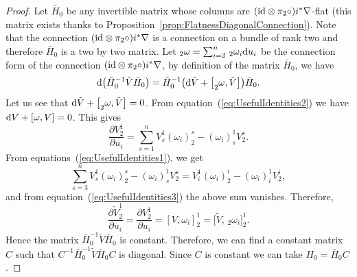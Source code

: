 \documentclass[10pt,a4paper]{amsart}
\numberwithin{equation}{section}
\begin{document}
 \begin{proof}
 Let $\bar{H}_{0}$ be any invertible matrix whose columns are $({\rm id}\otimes\pi_{2}\circ)i^{*}\nabla$-flat (this matrix exists thanks to Proposition~\ref{prop:FlatnessDiagonalConnection}). Note that the connection $({\rm id}\otimes\pi_{2}\circ)i^{*}\nabla$ is a connection on a bundle of rank two and therefore $\bar{H}_{0}$ is a two by two matrix. Let $_{2}\omega=\sum_{i=2}^{n}\,_{2}\omega_{i}{\rm d}u_{i}$ be the connection form of the connection $({\rm id}\otimes\pi_{2}\circ)i^{*}\nabla$, by definition of the matrix $\bar{H}_{0}$, we have
 \begin{equation*}
 {\rm d}\bigl(\bar{H}_{0}^{-1}\tilde{V}\bar{H}_{0}\bigr)=\bar{H}_{0}^{-1}\bigl({\rm d}\tilde{V}+\big[_{2}\omega,\tilde{V}\big]\bigr)\bar{H}_{0}.
 \end{equation*}
 Let us see that ${\rm d}\tilde{V}+\big[_{2}\omega,\tilde{V}\big]=0$. From equation~(\ref{eq:UsefulIdentities2}) we have ${\rm d}V+[\omega,V]=0$. This gives
 \begin{equation*}
 \frac{\partial V^{1}_{2}}{\partial u_{i}}=\sum_{s=1}^{n}V^{1}_{s}(\omega_{i})^{s}_{2}-(\omega_{i})^{1}_{s}V^{s}_{2}.
 \end{equation*}
 From equations~(\ref{eq:UsefulIdentities1}), we get
 \begin{equation*}
 \sum_{s=3}^{n}V^{1}_{s}(\omega_{i})^{s}_{2}-(\omega_{i})^{1}_{s}V^{s}_{2}=V^{1}_{i}(\omega_{i})^{i}_{2}-(\omega_{i})^{1}_{i}V^{i}_{2},
 \end{equation*}
 and from equation~(\ref{eq:UsefulIdentities3}) the above sum vanishes. Therefore,
 \begin{equation*}
 \frac{\partial\tilde{V}^{1}_{2}}{\partial u_{i}}=\frac{\partial V^{1}_{2}}{\partial u_{i}}=[V,\omega_{i}]^{1}_{2}=\big[\tilde{V}, \,_{2}\omega_{i}\big]^{1}_{2}.
 \end{equation*}
 Hence the matrix $\bar{H}_{0}^{-1}\tilde{V}\bar{H}_{0}$ is constant. Therefore, we can find a constant matrix $C$ such that $C^{-1}\bar{H}_{0}^{-1}\tilde{V}\bar{H}_{0}C$ is diagonal. Since $C$ is constant we can take $H_{0}=\bar{H}_{0}C$.
 \end{proof}
\end{document}
